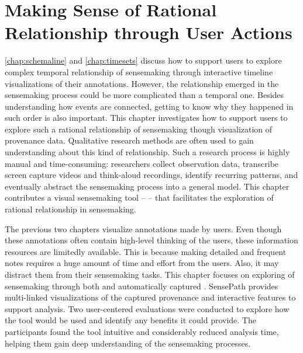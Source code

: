 \chapter{Making Sense of Rational Relationship through User Actions}
\label{chap:sensepath}

\graphicspath{{Chapter5/figures/}}


\pagebreak
\autoref{chap:schemaline} and \autoref{chap:timesets} discuss how to support users to explore complex temporal relationship of sensemaking through interactive timeline visualizations of their annotations. However, the relationship emerged in the sensemaking process could be more complicated than a temporal one. Besides understanding how events are connected, getting to know why they happened in such order is also important. This chapter investigates how to support users to explore such a rational relationship of sensemaking though visualization of provenance data. Qualitative research methods are often used to gain understanding about this kind of relationship. Such a research process is highly manual and time-consuming: researchers collect observation data, transcribe screen capture videos and think-aloud recordings, identify recurring patterns, and eventually abstract the sensemaking process into a general model. This chapter contributes a visual sensemaking tool -- \emph{} -- that facilitates the exploration of rational relationship in sensemaking. 

The previous two chapters visualize annotations made by users. Even though these annotations often contain high-level thinking of the users, these information resources are limitedly available. This is because making detailed and frequent notes requires a huge amount of time and effort from the users. Also, it may distract them from their sensemaking tasks. This chapter focuses on exploring  of sensemaking through both  and automatically captured . SensePath provides multi-linked visualizations of the captured provenance and interactive features to support analysis. Two user-centered evaluations were conducted to explore how the tool would be used and identify any benefits it could provide. The participants found the tool intuitive and considerably reduced analysis time, helping them gain deep understanding of the sensemaking processes.






